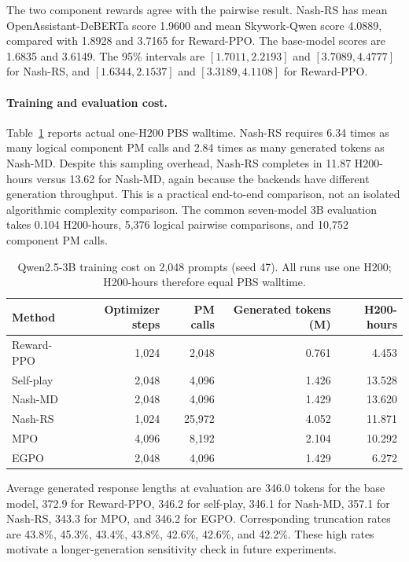 The two component rewards agree with the pairwise result.  Nash-RS has mean
OpenAssistant-DeBERTa score 1.9600 and mean Skywork-Qwen score 4.0889, compared
with 1.8928 and 3.7165 for Reward-PPO.  The base-model scores are 1.6835 and
3.6149.  The 95\% intervals are $[1.7011,2.2193]$ and $[3.7089,4.4777]$ for
Nash-RS, and $[1.6344,2.1537]$ and $[3.3189,4.1108]$ for Reward-PPO.

\paragraph{Training and evaluation cost.}
Table~\ref{tab:3b-cost} reports actual one-H200 PBS walltime.  Nash-RS requires
6.34 times as many logical component PM calls and 2.84 times as many generated
tokens as Nash-MD.  Despite this sampling overhead, Nash-RS completes in 11.87
H200-hours versus 13.62 for Nash-MD, again because the backends have different
generation throughput.  This is a practical end-to-end comparison, not an
isolated algorithmic complexity comparison.  The common seven-model 3B
evaluation takes 0.104 H200-hours, 5,376 logical pairwise comparisons, and
10,752 component PM calls.

\begin{table}[t]
  \centering
  \caption{Qwen2.5-3B training cost on 2,048 prompts (seed 47).  All runs use
  one H200; H200-hours therefore equal PBS walltime.}
  \label{tab:3b-cost}
  \small
  \begin{tabular}{lrrrr}
    \toprule
    Method & Optimizer steps & PM calls & Generated tokens (M) & H200-hours \\
    \midrule
    Reward-PPO & 1,024 & 2,048 & 0.761 & 4.453 \\
    Self-play & 2,048 & 4,096 & 1.426 & 13.528 \\
    Nash-MD & 2,048 & 4,096 & 1.429 & 13.620 \\
    Nash-RS & 1,024 & 25,972 & 4.052 & 11.871 \\
    MPO & 4,096 & 8,192 & 2.104 & 10.292 \\
    EGPO & 2,048 & 4,096 & 1.429 & 6.272 \\
    \bottomrule
  \end{tabular}
\end{table}

Average generated response lengths at evaluation are 346.0 tokens for the
base model, 372.9 for Reward-PPO, 346.2 for self-play, 346.1 for Nash-MD, 357.1
for Nash-RS, 343.3 for MPO, and 346.2 for EGPO.  Corresponding truncation rates
are 43.8\%, 45.3\%, 43.4\%, 43.8\%, 42.6\%, 42.6\%, and 42.2\%.  These high
rates motivate a longer-generation sensitivity check in future experiments.

